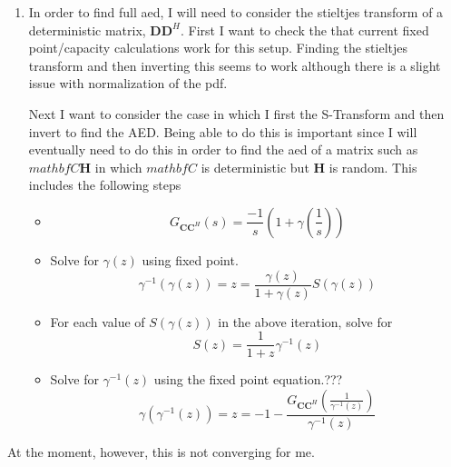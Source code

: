 \documentclass[12pt,a4paper]{report}
\begin{document}
\begin{enumerate}
\item
In order to find full aed, I will need to consider the stieltjes transform of a deterministic matrix, $\mathbf{D}\mathbf{D}^H$. 
First I want to check the that current fixed point/capacity calculations work for this setup.
Finding the stieltjes transform and then inverting this seems to work although there is a slight issue with normalization of the pdf.
\par
Next I want to consider the case in which I first the S-Transform and then invert to find the AED. Being able to do this is important since I will eventually need to do this in order to find the aed of a matrix such as
$mathbf{C}\mathbf{H}$ in which $mathbf{C}$ is deterministic but $\mathbf{H}$ is random. 
This includes the following steps
\begin{itemize}
\item 
\begin{equation}
G_{\mathbf{C}\mathbf{C}^H}(s) = \frac{-1}{s}(1+\gamma(\frac{1}{s}))
\end{equation}
\item
Solve for $\gamma(z)$ using fixed point.
\begin{equation}
\gamma^{-1}(\gamma(z)) = z = \frac{\gamma(z)}{1+\gamma(z)} S(\gamma(z))
\end{equation}
\item
For each value of $S(\gamma(z))$ in the above iteration, solve
for 
\begin{equation}
S(z) = \frac{1}{1+z} \gamma^{-1}(z)
\end{equation}
\item 
Solve for $\gamma^{-1}(z)$ using the fixed point equation.???
\begin{equation}
\gamma(\gamma^{-1}(z)) = z = -1 - \frac{G_{\mathbf{C}\mathbf{C}^H}(\frac{1}{\gamma^{-1}(z)})}{\gamma^{-1}(z)}
\end{equation}
\end{itemize}
\end{enumerate}
At the moment, however, this is not converging for me. 

\end{document}
